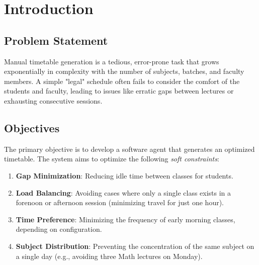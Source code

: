 \documentclass[a4paper,twoside,11pt]{article}
\begin{document}
    \begin{abstract}
        The scheduling of academic timetables is a classic formulation of a Constraint Satisfaction Problem (CSP) and Constraint Optimization Problem (COP). It involves assigning resources (instructors, rooms, etc.) to tasks (classes) at specific times while adhering to strict rules. This project proposes an automated Timetable Scheduler that utilizes a two-phase Artificial Intelligence approach. Phase I focuses on generating valid solutions that satisfy all \emph{hard} constraints (e.g., preventing double-booking of professors). Phase II employs an evolutionary local search algorithm to refine these valid schedules against \emph{soft} constraints (e.g., minimizing gaps between classes, avoiding early morning saturation). The result is a system capable of producing a conflict-free, human-friendly academic schedule.
    \end{abstract}

    \section{Introduction}
        \subsection{Problem Statement}
            Manual timetable generation is a tedious, error-prone task that grows exponentially in complexity with the number of subjects, batches, and faculty members. A simple "legal" schedule often fails to consider the comfort of the students and faculty, leading to issues like erratic gaps between lectures or exhausting consecutive sessions. 
            
        \subsection{Objectives}
            The primary objective is to develop a software agent that generates an optimized timetable. The system aims to optimize the following \emph{soft constraints}:
            \begin{enumerate}
                \itemsep0em
                \item \textbf{Gap Minimization}: Reducing idle time between classes for students.
                \item \textbf{Load Balancing}: Avoiding cases where only a single class exists in a forenoon or afternoon session (minimizing travel for just one hour).
                \item \textbf{Time Preference}: Minimizing the frequency of early morning classes, depending on configuration.
                \item \textbf{Subject Distribution}: Preventing the concentration of the same subject on a single day (e.g., avoiding three Math lectures on Monday).
            \end{enumerate}
\end{document}
